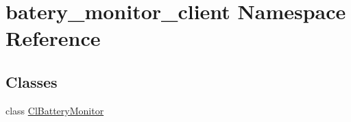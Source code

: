 \hypertarget{namespacebatery__monitor__client}{}\section{batery\+\_\+monitor\+\_\+client Namespace Reference}
\label{namespacebatery__monitor__client}
\subsection*{Classes}
\begin{DoxyCompactItemize}
\item 
class \hyperlink{classbatery__monitor__client_1_1ClBatteryMonitor}{Cl\+Battery\+Monitor}
\end{DoxyCompactItemize}
